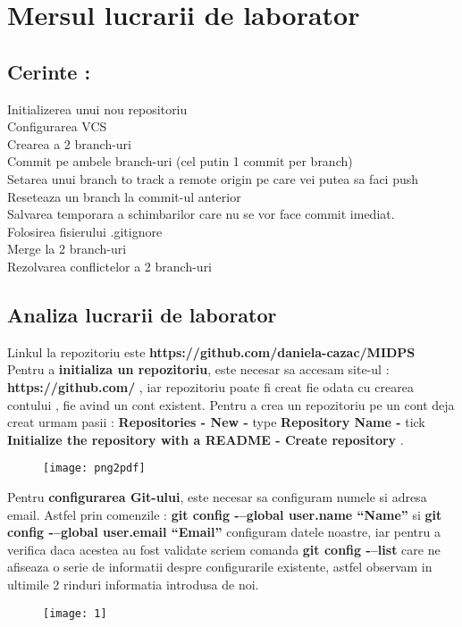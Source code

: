 \section{Mersul lucrarii de laborator}

\subsection{Cerinte :}
Initializerea unui nou repositoriu \\
Configurarea VCS \\
Crearea a 2 branch-uri \\
Commit pe ambele branch-uri (cel putin 1 commit per branch)\\
Setarea unui branch to track a remote origin pe care vei putea sa faci push \\
Reseteaza un branch la commit-ul anterior \\
Salvarea temporara a schimbarilor care nu se vor face commit imediat. \\
Folosirea fisierului .gitignore \\
Merge la 2 branch-uri \\
Rezolvarea conflictelor a 2 branch-uri \\

\subsection{Analiza lucrarii de laborator }
\tab Linkul la repozitoriu este \textbf{https://github.com/daniela-cazac/MIDPS} \\
Pentru a \textbf{initializa un repozitoriu}, este necesar sa accesam site-ul : \textbf{https://github.com/} , iar repozitoriu poate fi creat fie odata cu crearea contului , fie avind un cont existent. Pentru a crea un repozitoriu pe un cont deja creat urmam pasii : \textbf{Repositories - New -} type \textbf{Repository Name -} tick \textbf{Initialize the repository with a README - Create repository} .\\
\begin{figure}[h]
\centering
\texttt{[image: png2pdf]}
\end{figure}
\clearpage

\tab Pentru \textbf{configurarea Git-ului}, este necesar sa configuram numele si adresa email. Astfel prin comenzile : \textbf{git config -–global user.name “Name”} si \textbf{git config -–global user.email “Email”} configuram datele noastre, iar pentru a verifica daca acestea au fost validate scriem comanda \textbf{git config -–list} care ne afiseaza o serie de informatii despre configurarile existente, astfel observam in ultimile 2 rinduri informatia introdusa de noi.
\begin{figure}[h]
\centering
\texttt{[image: 1]}
\end{figure}


